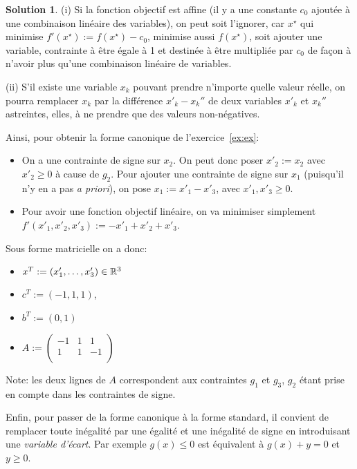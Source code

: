 \documentclass[a4paper,francais]{article}
\newcommand{\R}{{\ensuremath\mathbb{R}}}
\theoremstyle{definition}
\newtheorem*{solution}{Solution}
\begin{document}
\begin{solution}
  (i) Si la fonction objectif est affine (il y a une constante $c_0$ ajoutée à une
  combinaison linéaire des variables), on peut soit l'ignorer, car $x^\star$ qui
  minimise $f'(x^\star)  := f(x^\star) - c_0$, minimise aussi $f(x^\star)$, soit
  ajouter une variable, contrainte à être égale à 1 et destinée à être multipliée
  par $c_0$ de façon à n'avoir plus qu'une combinaison linéaire de variables. 
  
  (ii) S'il existe une variable $x_k$ pouvant prendre n'importe quelle valeur réelle,
  on pourra remplacer $x_k$ par la différence $x'_k - x_k''$ de deux variables
  $x'_k$ et $x_k''$ astreintes, elles, à ne prendre que des valeurs non-négatives.

  Ainsi, pour obtenir la forme canonique de l'exercice~\ref{ex:ex}:
  \begin{itemize}
  \item On a une contrainte de signe sur $x_2$. On peut donc poser $x'_2 := x_2$
    avec $x'_2 \geq 0$ à cause de $g_2$. Pour ajouter une contrainte de signe
    sur $x_1$ (puisqu'il n'y en a pas \emph{a priori}), on pose $x_1 := x'_1 - x'_3$,
    avec $x'_1, x'_3 \geq 0$. 
  \item Pour avoir une fonction objectif linéaire, on va minimiser simplement
    $f'(x'_1, x'_2, x'_3) := -x'_1 + x'_2 + x'_3$. 
  \end{itemize}
  Sous forme matricielle on a donc: 
  \begin{itemize}
  \item $x^T := (x'_1, \dots, x'_3) \in \R^3$
  \item $c^T := (-1, 1, 1)$,
  \item $b^T := (0, 1)$
  \item $A :=
    \left(
    \begin{array}{cccccc}
      -1 & 1 & 1 \\
      1 & 1 & -1 \\
    \end{array}
    \right)$
  \end{itemize}
  Note: les deux lignes de $A$ correspondent aux contraintes $g_1$ et $g_3$, $g_2$
  étant prise en compte dans les contraintes de signe. 
  
  Enfin, pour passer de la forme canonique à la forme standard, il convient de remplacer
  toute inégalité par une égalité et une inégalité de signe
  en introduisant une \emph{variable d'écart}.
  Par exemple $g(x) \leq 0$ est équivalent
  à $g(x) + y = 0$ et $y \geq 0$.


\end{solution}
\end{document}
